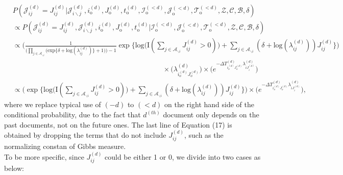 \documentclass[a4paper]{article}
\begin{document}
       \begin{equation}
       \begin{aligned}
       &P(\mathcal{J}^{(d)}_{ij} = {J}^{(d)}_{ij}|\mathcal{J}^{(d)}_{i\backslash j}, i^{(d)}_{\mbox{o}}, J^{(d)}_{\mbox{o}}, t^{(d)}_{\mbox{o}}, \mathcal{I}^{(<d)}_{\mbox{o}}, \mathcal{J}^{(<d)}_{\mbox{o}}, \mathcal{T}^{(<d)}_{\mbox{o}}, \mathcal{Z}, \mathcal{C}, \mathcal{B}, \delta)\\&\propto P(\mathcal{J}^{(d)}_{ij} ={J}^{(d)}_{ij}, \mathcal{J}^{(d)}_{i\backslash j}, i^{(d)}_{\mbox{o}}, J^{(d)}_{\mbox{o}}, t^{(d)}_{\mbox{o}}| \mathcal{I}^{(<d)}_{\mbox{o}}, \mathcal{J}^{(<d)}_{\mbox{o}}, \mathcal{T}^{(<d)}_{\mbox{o}}, \mathcal{Z}, \mathcal{C}, \mathcal{B}, \delta)
       \\&\propto\Big( \frac{1}{\Big(\prod_{j \in \mathcal{A}_{\backslash i}} \Big(\mbox{exp}\{\delta+\mbox{log}(\lambda_{ij}^{(d)})\} + 1\Big)\Big)-1}\exp\Big\{\mbox{log}\big(\text{I}( \sum_{j \in \mathcal{A}_{\backslash i}} J^{(d)}_{ij} > 0 )\big) +\sum_{j \in \mathcal{A}_{\backslash i}} (\delta+\mbox{log}(\lambda_{ij}^{(d)}))J_{ij}^{(d)} \Big\}\Big)\\&\quad\quad\quad\quad\quad\quad\quad\quad\quad\quad\quad\quad\quad\quad\quad\quad\quad\quad\quad\quad\quad\times \Big(\lambda^{(d)}_{i_o^{(d)}J_{o}^{(d)}}\Big)\times \Big(e^{-\Delta T^{(d)}_{i_o^{(d)}J_o^{(d)}}\lambda^{(d)}_{iJ^{(d)}_{i}}}\Big)
       \\& \propto \Big(\exp\Big\{\mbox{log}\big(\text{I}( \sum_{j \in \mathcal{A}_{\backslash i}} J^{(d)}_{ij} > 0 )\big) +\sum_{j \in \mathcal{A}_{\backslash i}} (\delta+\mbox{log}(\lambda_{ij}^{(d)}))J_{ij}^{(d)} \Big\}\Big)\times \Big(e^{-\Delta T^{(d)}_{i_o^{(d)}J_o^{(d)}}\lambda^{(d)}_{iJ^{(d)}_{i}}}\Big),
       \end{aligned}
       \end{equation}
       where we replace typical use of $(-d)$ to $(<d)$ on the right hand side of the conditional probability, due to the fact that $d^{(th)}$ document only depends on the past documents, not on the future ones. The last line of Equation (17) is obtained by dropping the terms that do not include $J^{(d)}_{ij}$, such as the normalizing constan of Gibbs measure. \\ \newline
       To be more specific, since ${J}^{(d)}_{ij}$ could be either 1 or 0, we divide into two cases as below:
\end{document}
